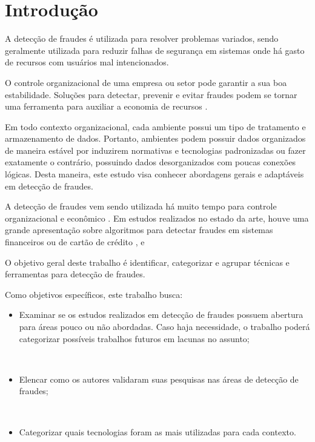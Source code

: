 \documentclass[smallextended]{svjour3}
\begin{document}
\section{Introdução}
\label{sec:1}

A detecção de fraudes é utilizada para resolver problemas variados, sendo geralmente utilizada para reduzir falhas de segurança em sistemas onde há gasto de recursos com usuários mal intencionados.

O controle organizacional de uma empresa ou setor pode garantir a sua boa estabilidade. Soluções para detectar, prevenir e evitar fraudes podem se tornar uma ferramenta para auxiliar a economia de recursos \citep{809570}. 

Em todo contexto organizacional, cada ambiente possui um tipo de tratamento e armazenamento de dados. Portanto, ambientes podem possuir dados organizados de maneira estável por induzirem normativas e tecnologias padronizadas ou fazer exatamente o contrário, possuindo dados desorganizados com poucas conexões lógicas. Desta maneira, este estudo visa conhecer abordagens gerais e adaptáveis em detecção de fraudes.

A detecção de fraudes vem sendo utilizada há muito tempo para controle organizacional e econômico \citep{Seyedhossein2010}. Em estudos realizados no estado da arte, houve uma grande apresentação sobre algoritmos para detectar fraudes em sistemas financeiros ou de cartão de crédito \citep{809570}, \citep{Chandola:2009:ADS:1541880.1541882} e \citep{Abdallah2016}

O objetivo geral deste trabalho é identificar, categorizar e agrupar técnicas e ferramentas para detecção de fraudes.

Como objetivos específicos, este trabalho busca:

\begin{itemize}
	\item Examinar se os estudos realizados em detecção de fraudes possuem abertura para áreas pouco ou não abordadas. Caso haja necessidade, o trabalho poderá categorizar possíveis trabalhos futuros em lacunas no assunto;
	
	\
	
	\item Elencar como os autores validaram suas pesquisas nas áreas de detecção de fraudes;
	
	\
		
	\item Categorizar quais tecnologias foram as mais utilizadas para cada contexto.
\end{itemize}
\end{document}
